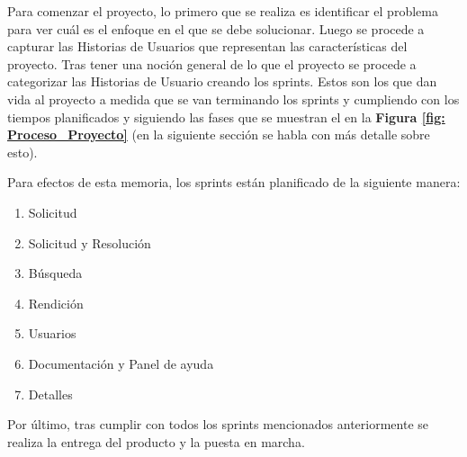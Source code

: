 Para comenzar el proyecto, lo primero que se realiza es identificar el problema para ver cuál es el enfoque en el que se debe solucionar. Luego se procede a capturar las Historias de Usuarios que representan las características del proyecto. Tras tener una noción general de lo que el proyecto se procede a categorizar las Historias de Usuario creando los sprints. Estos son los que dan vida al proyecto a medida que se van terminando los sprints y cumpliendo con los tiempos planificados y siguiendo las fases que se muestran el en la \textbf{Figura \ref{fig: Proceso_Proyecto}} (en la siguiente sección se habla con más detalle sobre esto). 

Para efectos de esta memoria, los sprints están planificado de la siguiente manera:

\begin{enumerate}
    \item Solicitud
    \item Solicitud y Resolución
    \item Búsqueda
    \item Rendición
    \item Usuarios
    \item Documentación y Panel de ayuda
    \item Detalles
\end{enumerate}

Por último, tras cumplir con todos los sprints mencionados anteriormente se realiza la entrega del producto y la puesta en marcha.